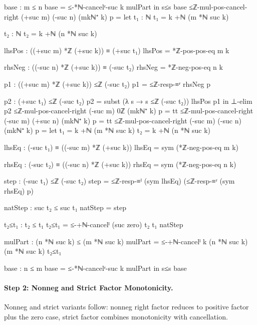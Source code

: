 \documentclass[11pt,a4paper]{book}
\begin{document}
\begin{code}
    base : m ≤ n
    base = ≤-*ℕ-cancelʳ-suc k mulPart
  in
  s≤s base
≤ℤ-mul-pos-cancel-right (+suc m) (-suc n) (mkℕ⁺ k) p =
  let
    t₁ : ℕ
    t₁ = k +ℕ (m *ℕ suc k)

    t₂ : ℕ
    t₂ = k +ℕ (n *ℕ suc k)

    lhsPos : ((+suc m) *ℤ (+suc k)) ≡ (+suc t₁)
    lhsPos = *ℤ-pos-pos-eq m k

    rhsNeg : ((-suc n) *ℤ (+suc k)) ≡ (-suc t₂)
    rhsNeg = *ℤ-neg-pos-eq n k

    p1 : ((+suc m) *ℤ (+suc k)) ≤ℤ (-suc t₂)
    p1 = ≤ℤ-resp-≡ʳ rhsNeg p

    p2 : (+suc t₁) ≤ℤ (-suc t₂)
    p2 = subst (λ s → s ≤ℤ (-suc t₂)) lhsPos p1
  in
  ⊥-elim p2
≤ℤ-mul-pos-cancel-right (-suc m) 0ℤ (mkℕ⁺ k) p = tt
≤ℤ-mul-pos-cancel-right (-suc m) (+suc n) (mkℕ⁺ k) p = tt
≤ℤ-mul-pos-cancel-right (-suc m) (-suc n) (mkℕ⁺ k) p =
  let
    t₁ = k +ℕ (m *ℕ suc k)
    t₂ = k +ℕ (n *ℕ suc k)

    lhsEq : (-suc t₁) ≡ ((-suc m) *ℤ (+suc k))
    lhsEq = sym (*ℤ-neg-pos-eq m k)

    rhsEq : (-suc t₂) ≡ ((-suc n) *ℤ (+suc k))
    rhsEq = sym (*ℤ-neg-pos-eq n k)

    step : (-suc t₁) ≤ℤ (-suc t₂)
    step =
      ≤ℤ-resp-≡ˡ (sym lhsEq)
        (≤ℤ-resp-≡ʳ (sym rhsEq) p)

    natStep : suc t₂ ≤ suc t₁
    natStep = step

    t₂≤t₁ : t₂ ≤ t₁
    t₂≤t₁ = ≤-+ℕ-cancelˡ (suc zero) t₂ t₁ natStep

    mulPart : (n *ℕ suc k) ≤ (m *ℕ suc k)
    mulPart = ≤-+ℕ-cancelˡ k (n *ℕ suc k) (m *ℕ suc k) t₂≤t₁

    base : n ≤ m
    base = ≤-*ℕ-cancelʳ-suc k mulPart
  in
  s≤s base
\end{code}

\paragraph{Step 2: Nonneg and Strict Factor Monotonicity.}
Nonneg and strict variants follow: nonneg right factor reduces to
positive factor plus the zero case, strict factor combines monotonicity
with cancellation.
\end{document}
